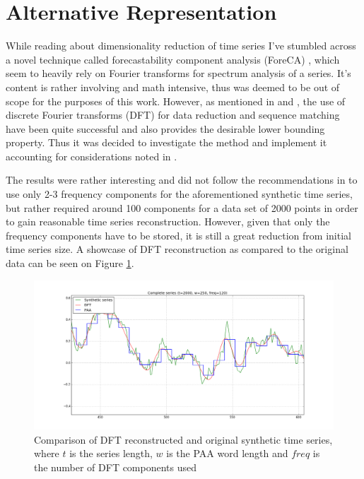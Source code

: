 \documentclass{article}
\begin{document}
\section{Alternative Representation}
While reading about dimensionality reduction of time series I've stumbled across a novel technique called forecastability component analysis (ForeCA) \cite{goerg2013forecastable} \cite{goerg2013forecastable_presentation}, which seem to heavily rely on Fourier transforms for spectrum analysis of a series. It's content is rather involving and math intensive, thus was deemed to be out of scope for the purposes of this work. However, as mentioned in \cite{shieh2008sax} and \cite{faloutsos1994fast}, the use of discrete Fourier transforms (DFT) for data reduction and sequence matching have been quite successful and also provides the desirable lower bounding property. Thus it was decided to investigate the method and implement it accounting for considerations noted in \cite{faloutsos1994fast}.\par
The results were rather interesting and did not follow the recommendations in \cite{faloutsos1994fast} to use only 2-3 frequency components for the aforementioned synthetic time series, but rather required around 100 components for a data set of 2000 points in order to gain reasonable time series reconstruction. However, given that only the frequency components have to be stored, it is still a great reduction from initial time series size. A showcase of DFT reconstruction as compared to the original data can be seen on Figure \ref{fig:1}.
\begin{figure}[h!]
	\begin{center}
		\includegraphics[width=\textwidth]{images/dft-visualization}
		\caption{Comparison of DFT reconstructed and original synthetic time series, where $t$ is the series length, $w$ is the PAA word length and $freq$ is the number of DFT components used}
		\label{fig:1}
	\end{center}
\end{figure}
\end{document}
